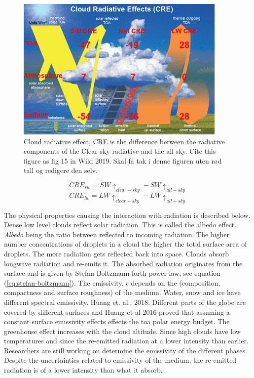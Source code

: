 \begin{figure}[h]
    \centering
    \includegraphics[scale = 7]{Chapter1_Intro/images/CRE_wild2019.jpg}
    \caption{Cloud radiative effect, CRE is the difference between the radiative components of the Clear sky radiative and the all sky. Cite this figure as fig 15 in Wild 2019. Skal få tak i denne figuren uten rød tall og redigere den selv.}
    \label{fig:cre}
\end{figure}

\begin{equation} \label{eq:cre_sw}
    CRE_{sw} = SW\uparrow_{clear-sky} - SW\uparrow_{all-sky}
\end{equation}
\begin{equation} \label{eq:cre_lw}
    CRE_{lw} = LW\uparrow_{clear-sky} - LW\uparrow_{all-sky}
\end{equation}

The physical properties causing the interaction with radiation is described below. Dense low level clouds reflect solar radiation. This is called the albedo effect. \textit{Albedo} being the ratio between reflected to incoming radiation. The higher number concentrations of droplets in a cloud the higher the total surface area of droplets. The more radiation gets reflected back into space. Clouds absorb longwave radiation and re-emits it. The absorbed radiation originates from the surface and is given by Stefan-Boltzmann forth-power law, see equation (\ref{eq:stefan-boltzmann}). The emissivity, $\epsilon$ depends on the (composition, compactness and surface roughness) of the medium. Water, snow and ice have different spectral emissivity. Huang et. al., 2018. Different parts of the globe are covered by different surfaces and Huang et al 2016 proved that assuming a constant surface emissivity effects effects the \acrshort{toa} polar energy budget. The greenhouse effect increases with the cloud altitude. Since high clouds have low temperatures and since the re-emitted radiation at a lower intensity than earlier. Researchers are still working on determine the emissivity of the different phases. Despite the uncertainties related to emissivity of the medium, the re-emitted radiation is of a lower intensity than what it absorb.

